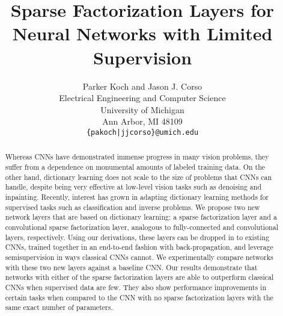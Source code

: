 \documentclass[10pt,twocolumn,letterpaper]{article}
\begin{document}
\title{Sparse Factorization Layers for Neural Networks with Limited Supervision}

\author{Parker Koch and Jason J. Corso\\
Electrical Engineering and Computer Science\\
University of Michigan\\
Ann Arbor, MI 48109\\
{\tt\small \{pakoch|jjcorso\}@umich.edu}
}

\maketitle

\begin{abstract}

Whereas CNNs have demonstrated immense progress in many vision problems, they 
    suffer from a dependence on monumental amounts 
    of labeled training data. On the other hand, dictionary learning does not scale to 
    the size of problems that CNNs can handle, despite being very effective at 
    low-level vision tasks such as denoising and inpainting. Recently, interest 
    has grown in adapting dictionary learning methods for supervised tasks such 
    as classification and inverse problems.  We propose two new network layers 
    that are based on dictionary learning: a sparse factorization layer and a 
    convolutional sparse factorization layer, analogous to fully-connected and 
    convolutional layers, respectively.
    Using our derivations, these layers can be dropped in to existing CNNs, 
    trained together in an end-to-end fashion with back-propagation, and 
    leverage semisupervision in ways classical CNNs cannot.  
    We experimentally compare networks with these two new layers against a baseline CNN.  Our results demonstrate that networks with either of the sparse factorization layers are able to outperform classical CNNs when supervised data are few.  They also show performance improvements in certain tasks when compared to the CNN with no sparse factorization layers with the same exact number of parameters.

\end{abstract}
\end{document}
